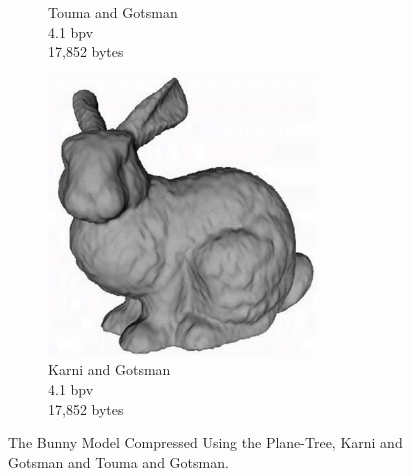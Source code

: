 \begin{figure}[H]
\begin{center}
\begin{subfigure}[b]{3in}
                \captionsetup{justification=centering}
                \caption{Touma and Gotsman \cite{touma98triangle}\\4.1 bpv\\17,852 bytes}
                \label{fig:PT_SOTAQ1_TG}
        \end{subfigure}%
        \begin{subfigure}[b]{3in}
                \includegraphics[width=2.8in]{images/experiments/pt_qual/kg}
                \captionsetup{justification=centering}
                \caption{Karni and Gotsman \cite{Karni00Spectral}\\4.1 bpv\\17,852 bytes}
                \label{fig:PT_SOTAQ1_KG}
        \end{subfigure}
       \caption{The Bunny Model Compressed Using the Plane-Tree, Karni and Gotsman and Touma and Gotsman.}
       \label{fig:qualSOTA1}
       \end{center}
\end{figure}


